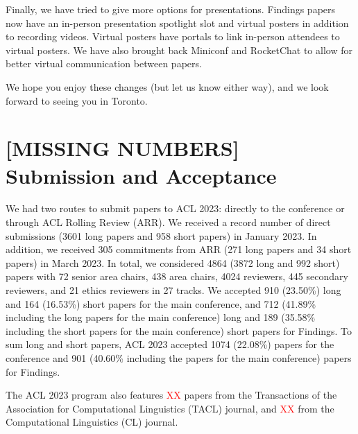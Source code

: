 Finally, we have tried to give more options for presentations.  Findings papers now have an in-person presentation spotlight slot and virtual posters in addition to recording videos.  Virtual posters have portals to link in-person attendees to virtual posters.  We have also brought back Miniconf and RocketChat to allow for better virtual communication between papers.

We hope you enjoy these changes (but let us know either way), and we look forward to seeing you in Toronto.



\section*{[MISSING NUMBERS] Submission and Acceptance}
We had two routes to submit papers to ACL 2023: directly to the conference or through ACL Rolling Review (ARR). We received a record number of direct submissions (3601 long papers and 958 short papers) in January 2023. In addition, we received 305 commitments from ARR (271 long papers and 34 short papers) in March 2023. In total, we considered 4864 (3872 long and 992 short) papers with 72 senior area chairs, 438 area chairs, 4024 reviewers, 445 secondary reviewers, and 21 ethics reviewers in 27 tracks. We accepted 910 (23.50\%) long and 164 (16.53\%) short papers for the main conference, and 712 (41.89\% including the long papers for the main conference) long and 189 (35.58\% including the short papers for the main conference) short papers for Findings. To sum long and short papers, ACL 2023 accepted 1074 (22.08\%) papers for the conference and 901 (40.60\% including the papers for the main conference) papers for Findings.

The ACL 2023 program also features \textcolor{red}{XX} papers from the Transactions of the Association for Computational Linguistics (TACL) journal, and \textcolor{red}{XX} from the Computational Linguistics (CL) journal.

